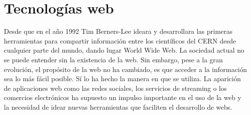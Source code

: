 \section{Tecnologías web}
Desde que en el año 1992 Tim Berners-Lee ideara y desarrollara las primeras herramientas para compartir información entre los científicos del CERN desde cualquier parte del mundo, dando lugar World Wide Web. La sociedad actual no se puede entender sin la existencia de la web. Sin embargo, pese a la gran evolución, el propósito de la web no ha cambiado, es que acceder a la información sea lo más fácil posible. Sí lo ha hecho la manera en que se utiliza. La aparición de aplicaciones web como las redes sociales, los servicios de streaming o los comercios electrónicos ha supuesto un impulso importante en el uso de la web y la necesidad de idear nuevas herramientas que faciliten el desarrollo de webs.

